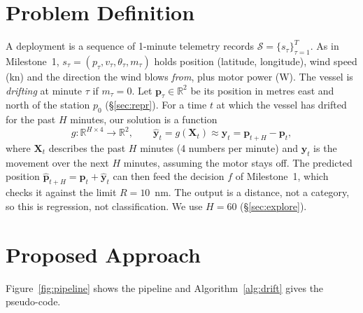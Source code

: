 \documentclass[sigconf]{acmart}
\begin{document}
\section{Problem Definition}\label{sec:problem}
%
A deployment is a sequence of 1-minute telemetry records $\mathcal{S}=\{s_\tau\}_{\tau=1}^{T}$. As in Milestone~1, $s_\tau=(p_\tau,v_\tau,\theta_\tau,m_\tau)$ holds position (latitude, longitude), wind speed (kn) and the direction the wind blows \emph{from}, plus motor power (W). The vessel is \emph{drifting} at minute $\tau$ if $m_\tau=0$. Let $\mathbf{p}_\tau\in\mathbb{R}^2$ be its position in metres east and north of the station $p_0$ (\S\ref{sec:repr}). For a time $t$ at which the vessel has drifted for the past $H$ minutes, our solution is a function
\begin{equation}\label{eq:g}
g:\mathbb{R}^{H\times 4}\rightarrow\mathbb{R}^{2},\qquad \hat{\mathbf{y}}_t=g(\mathbf{X}_t)\approx\mathbf{y}_t=\mathbf{p}_{t+H}-\mathbf{p}_t,
\end{equation}
where $\mathbf{X}_t$ describes the past $H$ minutes (4 numbers per minute) and $\mathbf{y}_t$ is the movement over the next $H$ minutes, assuming the motor stays off. The predicted position $\hat{\mathbf{p}}_{t+H}=\mathbf{p}_t+\hat{\mathbf{y}}_t$ can then feed the decision $f$ of Milestone~1, which checks it against the limit $R=10$~nm. The output is a distance, not a category, so this is regression, not classification. We use $H=60$ (\S\ref{sec:explore}).

\section{Proposed Approach}\label{sec:approach}
Figure~\ref{fig:pipeline} shows the pipeline and Algorithm~\ref{alg:drift} gives the pseudo-code.
\end{document}
